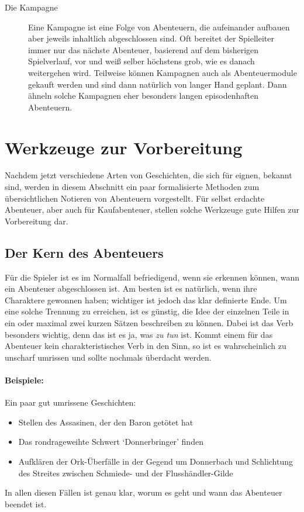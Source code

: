 \begin{description}
\item[Die Kampagne]
    Eine Kampagne ist eine Folge von Abenteuern, die aufeinander aufbauen aber
    jeweils inhaltlich abgeschlossen sind. Oft bereitet der Spielleiter immer
    nur das nächste Abenteuer, basierend auf dem bisherigen Spielverlauf, vor
    und weiß selber höchstens grob, wie es danach weitergehen wird. Teilweise
    können Kampagnen auch als Abenteuermodule gekauft werden und sind dann
    natürlich von langer Hand geplant. Dann ähneln solche Kampagnen eher
    besonders langen episodenhaften Abenteuern.
\end{description}



\section{Werkzeuge zur Vorbereitung}
Nachdem jetzt verschiedene Arten von Geschichten, die sich für \StoryDSA eignen, bekannt sind, werden in diesem Abschnitt ein paar formalisierte Methoden zum übersichtlichen Notieren von Abenteuern vorgestellt. Für selbst erdachte Abenteuer, aber auch für Kaufabenteuer, stellen solche Werkzeuge gute Hilfen zur Vorbereitung dar.


\subsection{Der Kern des Abenteuers}\label{subsec:DerKernDesAbenteuers}
Für die Spieler ist es im Normalfall befriedigend, wenn sie erkennen können, wann ein Abenteuer abgeschlossen ist. Am besten ist es natürlich, wenn ihre Charaktere gewonnen haben; wichtiger ist jedoch das klar definierte Ende. Um eine solche Trennung zu erreichen, ist es günstig, die Idee der einzelnen Teile in ein oder maximal zwei kurzen Sätzen beschreiben zu können. Dabei ist das Verb besonders wichtig, denn das ist es ja, was \emph{zu tun} ist. Kommt einem für das Abenteuer kein charakteristisches Verb in den Sinn, so ist es wahrscheinlich zu unscharf umrissen und sollte nochmals überdacht werden.

\begin{beispiel}
\paragraph{Beispiele:} Ein paar gut umrissene Geschichten:
\begin{itemize}
\item Stellen des Assasinen, der den Baron getötet hat
\item Das rondrageweihte Schwert `Donnerbringer' finden
\item Aufklären der Ork-Überfälle in der Gegend um Donnerbach und Schlichtung des Streites zwischen Schmiede- und der Flusshändler-Gilde
\end{itemize}

In allen diesen Fällen ist genau klar, worum es geht und wann das Abenteuer beendet ist.
\end{beispiel}

